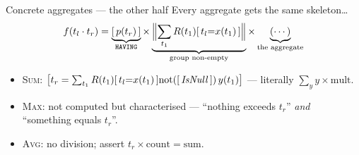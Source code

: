 \documentclass[9pt,aspectratio=169]{beamer}
\begin{document}
\begin{frame}[fragile]{Concrete aggregates --- the other half}
Every aggregate gets the same skeleton\dots
\[f(t_l\cdot t_r)=\underbrace{[\,p(t_r)\,]}_{\texttt{HAVING}}\times
\underbrace{\Bigl\lVert\sum_{t_1}R(t_1)[\,t_l{=}x(t_1)\,]\Bigr\rVert}_{\text{group non-empty}}\times
\underbrace{(\cdots)}_{\text{the aggregate}}\]
\vspace{-3mm}
\begin{itemize}\small
\item<2-> \textsc{Sum}: $\bigl[t_r=\sum_{t_1}R(t_1)[\,t_l{=}x(t_1)\,]\mathrm{not}([\,\mathit{IsNull}\,])\,y(t_1)\bigr]$
      --- literally $\sum_y y\times\text{mult}$.
\item<3-> \textsc{Max}: not computed but \alert{characterised} ---
      ``nothing exceeds $t_r$'' \emph{and} ``something equals $t_r$''.
\item<4-> \textsc{Avg}: no division; assert $t_r\times\mathrm{count}=\mathrm{sum}$.
\end{itemize}
\vspace{2mm}
\end{frame}
\end{document}
